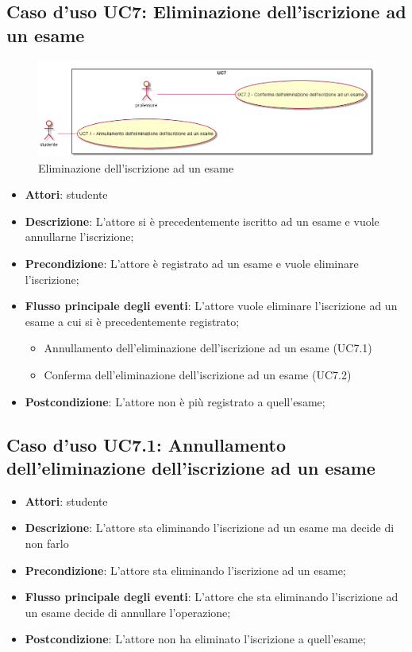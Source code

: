 \subsection{Caso d'uso \texorpdfstring{UC7}{UC7}: Eliminazione dell'iscrizione ad un esame}
\begin{figure} [H]
\centering
\includegraphics[scale=0.45]{./img/UC7.png}
\caption{Eliminazione dell'iscrizione ad un esame}\label{}
\end{figure}
\begin{itemize}
\item \textbf{Attori}: studente
\item \textbf{Descrizione}: L'attore si è precedentemente iscritto ad un esame e vuole annullarne l'iscrizione;
\item \textbf{Precondizione}: L'attore è registrato ad un esame e vuole eliminare l'iscrizione;
\item \textbf{Flusso principale degli eventi}: L'attore vuole eliminare l'iscrizione ad un esame a cui si è precedentemente registrato;
\begin{itemize}
\item Annullamento dell'eliminazione dell'iscrizione ad un esame (UC7.1)
\item Conferma dell'eliminazione dell'iscrizione ad un esame (UC7.2)
\end{itemize}
\item \textbf{Postcondizione}: L'attore non è più registrato a quell'esame;
\end{itemize}
\subsection{Caso d'uso \texorpdfstring{UC7.1}{UC7.1}: Annullamento dell'eliminazione dell'iscrizione ad un esame}
\begin{itemize}
\item \textbf{Attori}: studente
\item \textbf{Descrizione}: L'attore sta eliminando l'iscrizione ad un esame ma decide di non farlo
\item \textbf{Precondizione}: L'attore sta eliminando l'iscrizione ad un esame;
\item \textbf{Flusso principale degli eventi}: L'attore che sta eliminando l'iscrizione ad un esame decide di annullare l'operazione;
\item \textbf{Postcondizione}: L'attore non ha eliminato l'iscrizione a quell'esame;
\end{itemize}
